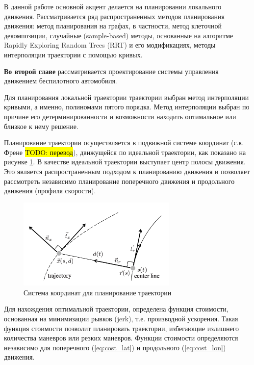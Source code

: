 В данной работе основной акцент делается на планировании локального движения. Рассматривается ряд распространенных
методов планирования движения: метод планирования на графах, в частности, метод клеточной декомпозиции, случайные
(sample-based) методы, основанные на алгоритме Rapidly Exploring Random Trees (RRT) и его модификациях, методы
интерполяции траектории с помощью кривых.

\textbf{Во второй главе} рассматривается проектирование системы управления движением беспилотного автомобиля.

Для планирования локальной траектории траектории выбран метод интерполяции кривыми, а именно, полиномами
пятого порядка. Метод интерполяции выбран по причине его детерминированности и возможности находить оптимальное
или близкое к нему решение.

Планирование траектории осуществляется в подвижной системе координат (с.к. Френе \hl{TODO: перевод}),
движущейся по идеальной траектории, как показано на рисунке \ref{img:junior_frenet_frame}. В качестве
идеальной траектории  выступает центр полосы движения. Это является распространенным подходом к
планированию движения и позволяет рассмотреть независимо планирование поперечного движения и
продольного движения (профиля скорости).

\begin{figure}[h]
    \centering
    \includegraphics[width=0.7\textwidth]{images/junior_frenet_frame}
    \caption{Система координат для планирование траектории}
    \label{img:junior_frenet_frame}
\end{figure}

Для нахождения оптимальной траектории, определена функция стоимости, основанная на минимизации рывков
(jerk), т.е. производной ускорения. Такая функция стоимости позволит планировать траектории, избегающие
излишнего количества маневров или резких маневров. Функции стоимости определяются независимо для
поперечного (\ref{eq:cost_lat}) и продольного (\ref{eq:cost_lon}) движения.

